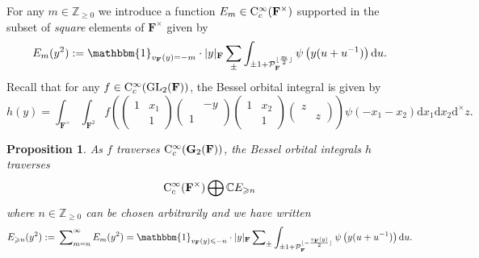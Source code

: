 \documentclass[A4]{amsart}
\def\leq{\leqslant}
\def\geq{\geqslant}
\newtheorem{proposition}[theorem]{Proposition}
\numberwithin{equation}{section} \everymath{\displaystyle}
\newcommand{\Cont}{{\rm C}}
\newcommand{\gp}[1]{\mathbf{#1}}
\newcommand{\GL}{{\rm GL}}
\newcommand{\Z}{\mathbb{Z}}
\newcommand{\id}{\mathbbm{1}}
\newcommand{\ud}{\mathrm{d}}
\newcommand{\C}{\mathbb{C}}
\newcommand{\F}{\mathbf{F}}
\newcommand{\vP}{\mathcal{P}}
\newcommand{\norm}[1][\cdot]{\lvert #1 \rvert}
\begin{document}
	For any $m \in \Z_{\geq 0}$ we introduce a function $E_m \in \Cont_c^{\infty}(\F^{\times})$ supported in the subset of \emph{square} elements of $\F^{\times}$ given by
\begin{equation} \label{eq: EleF}
	E_m(y^2) := \id_{v_{\F}(y)=-m} \cdot \norm[y]_{\F} \sum_{\pm} \int_{\pm1 + \vP_{\F}^{\lfloor \frac{m}{2} \rfloor}} \psi \left( y (u+u^{-1}) \right) \ud u.
\end{equation}
	Recall that for any $f \in \Cont_c^{\infty}(\GL_2(\F))$, the Bessel orbital integral \cite[(5.17)]{Wu24+} is given by
\begin{equation} \label{eq: BesselOrbInt}
	h(y) = \int_{\F^{\times}}  \int_{\F^2} f \left( \begin{pmatrix} 1 & x_1 \\ & 1 \end{pmatrix} \begin{pmatrix} & -y \\ 1 & \end{pmatrix} \begin{pmatrix} 1 & x_2 \\ & 1 \end{pmatrix} \begin{pmatrix} z & \\ & z \end{pmatrix} \right) \psi(-x_1-x_2) \ud x_1 \ud x_2 \ud^{\times} z.
\end{equation}
\begin{proposition} \label{prop: BesselOrbInt}
	As $f$ traverses $\Cont_c^{\infty}(\gp{G}_2(\F))$, the Bessel orbital integrals $h$ traverses
	$$ \Cont_c^{\infty}(\F^{\times}) \bigoplus \C E_{\geq n} $$
where $n \in \Z_{\geq 0}$ can be chosen arbitrarily and we have written 
\begin{equation} \label{eq: EleFBis}
	E_{\geq n}(y^2) := \sideset{}{_{m=n}^{\infty}} \sum E_m(y^2) = \id_{v_{\F}(y) \leq -n} \cdot \norm[y]_{\F} \sideset{}{_{\pm}} \sum \int_{\pm1 + \vP_{\F}^{\lfloor -\frac{v_{\F}(y)}{2} \rfloor}} \psi \left( y (u+u^{-1}) \right) \ud u. 
\end{equation}
\end{proposition}
\end{document}
